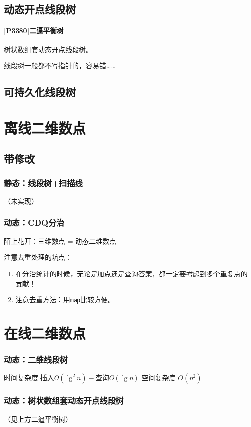 \documentclass{article}
\begin{document}
		\subsection{动态开点线段树}
			\paragraph{[P3380]二逼平衡树}
			树状数组套动态开点线段树。

			线段树一般都不写指针的，容易错……
			
		\subsection{可持久化线段树}
			
	\section{离线二维数点}
		\subsection{带修改}
			\subsubsection{静态：线段树+扫描线}
			（未实现）
			\subsubsection{动态：CDQ分治}
			陌上花开：三维数点 = 动态二维数点
			
			注意去重处理的坑点：
			\begin{enumerate}
				\item 在分治统计的时候，无论是加点还是查询答案，都一定要考虑到多个重复点的贡献！
				\item 注意去重方法：用\lstinline|map|比较方便。
			\end{enumerate}
			
	\section{在线二维数点}
		\subsubsection{动态：二维线段树}
		时间复杂度 $\text{插入} O(\lg^2 n) - \text{查询} O(\lg n)$
		空间复杂度 $O(n^2)$
		\subsubsection{动态：树状数组套动态开点线段树}
		（见上方二逼平衡树）
\end{document}
